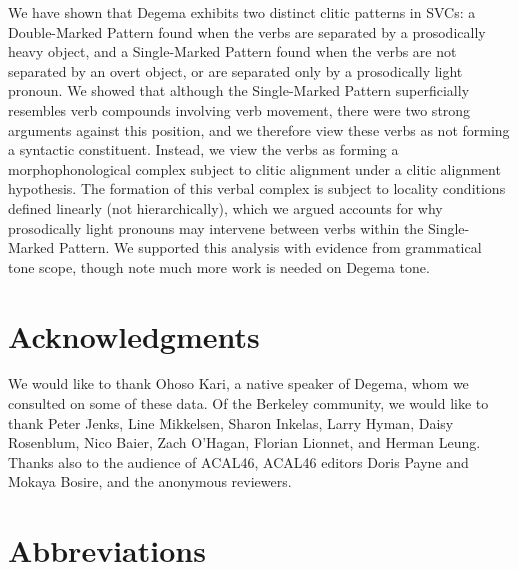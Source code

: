 We have shown that Degema exhibits two distinct clitic patterns in SVCs: a Double-Marked Pattern found when the verbs are separated by a prosodically heavy object, and a Single-Marked Pattern found when the verbs are not separated by an overt object, or are separated only by a prosodically light pronoun. We showed that although the Single-Marked Pattern superficially resembles verb compounds involving verb movement, there were two strong arguments against this position, and we therefore view these verbs as not forming a syntactic constituent. Instead, we view the verbs as forming a morphophonological complex subject to clitic alignment under a clitic alignment hypothesis. The formation of this verbal complex is subject to locality conditions defined linearly (not hierarchically), which we argued accounts for why prosodically light pronouns may intervene between verbs within the Single-Marked Pattern. We supported this analysis with evidence from grammatical tone scope, though note much more work is needed on Degema tone.

\chapter{Acknowledgments}

\begin{styleNoSpacing}
We would like to thank Ohoso Kari, a native speaker of Degema, whom we consulted on some of these data. Of the Berkeley community, we would like to thank Peter Jenks, Line Mikkelsen, Sharon Inkelas, Larry Hyman, Daisy Rosenblum, Nico Baier, Zach O’Hagan, Florian Lionnet, and Herman Leung. Thanks also to the audience of ACAL46, ACAL46 editors Doris Payne and Mokaya Bosire, and the anonymous reviewers.
\end{styleNoSpacing}

\chapter{Abbreviations}

